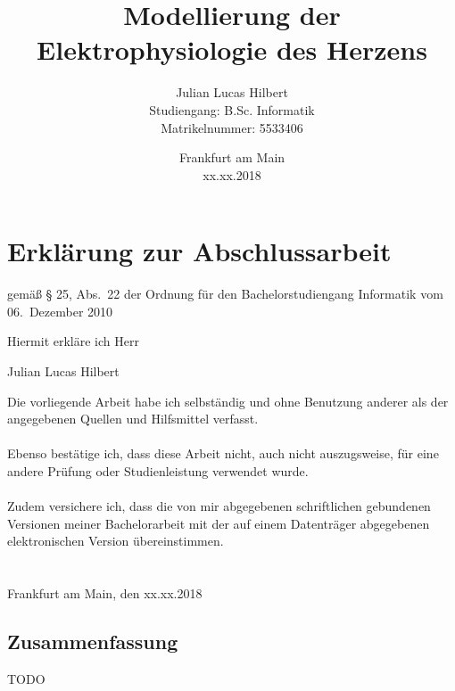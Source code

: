 \documentclass[
	a4paper,			%
	11pt,				%
	headsepline,		%
	bibtotoc,			%
	BCOR18mm,      		%
	DIV14,				%
	headings=normal,
	numbers=noenddot,
]{scrbook}
\title{Modellierung der Elektrophysiologie des Herzens}
\author{Julian Lucas Hilbert \\
		Studiengang: B.Sc. Informatik\\
		Matrikelnummer: 5533406}
\date{ \vspace{2cm} Frankfurt am Main \\ xx.xx.2018}
\theoremstyle{mythmstyle}
\theoremstyle{other}
\begin{document}
{
	\setcounter{tocdepth}{1}
	
	\pagestyle{empty}
	\maketitle
	
	
	
	{\let\clearpage\relax\section*{Erklärung zur Abschlussarbeit}}
	
	\begin{center}
		gemäß § 25, Abs.\ 22 der Ordnung für den Bachelorstudiengang Informatik vom 06.\ Dezember 2010
	\end{center}
	\vspace{1cm}
	Hiermit erkläre ich Herr\\
	\begin{center}
		Julian Lucas Hilbert
	\end{center}
	Die vorliegende Arbeit habe ich selbständig und ohne Benutzung anderer als der angegebenen Quellen und Hilfsmittel verfasst.
	\\\\
	Ebenso bestätige ich, dass diese Arbeit nicht, auch nicht auszugsweise, für eine andere Prüfung oder Studienleistung verwendet wurde.
	\\\\
	Zudem versichere ich, dass die von mir abgegebenen schriftlichen gebundenen Versionen meiner Bachelorarbeit mit der auf einem Datenträger abgegebenen elektronischen Version übereinstimmen.
	\\\\\\
	Frankfurt am Main, den xx.xx.2018
	
	\clearpage
	
	\subsection*{\hfil \hfil Zusammenfassung}
	TODO 
	
	\clearpage
	
	

	\large
	\tableofcontents
}
\end{document}
